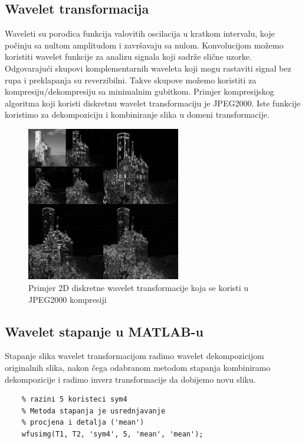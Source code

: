 \documentclass[lmodern, utf8, seminar]{fer}
\begin{document}
\subsection{Wavelet transformacija}
Waveleti su porodica funkcija valovitih oscilacija u kratkom intervalu, koje počinju sa nultom amplitudom i završavaju sa nulom. Konvolucijom možemo koristiti wavelet funkcije za analizu signala koji sadrže slične uzorke. Odgovarajući skupovi komplementarnih waveleta koji mogu rastaviti signal bez rupa i preklapanja su reverzibilni. Takve skupove možemo koristiti za kompresiju/dekompresiju sa minimalnim gubitkom. Primjer kompresijskog algoritma koji koristi diskretnu wavelet transformaciju je JPEG2000. Iste funkcije koristimo za dekompoziciju i kombiniranje slika u domeni transformacije. 

\begin{figure}[H]
	\centering
	\includegraphics[width=0.6\textwidth]{jpeg2000}
	\caption{Primjer 2D diskretne wavelet transformacije koja se koristi u JPEG2000 kompresiji}
	\label{fig:jpeg2000}
\end{figure}

\subsection{Wavelet stapanje u MATLAB-u}

Stapanje slika wavelet transformacijom radimo wavelet dekompozicijom originalnih slika, nakon čega odabranom metodom stapanja kombiniramo dekompozicije i radimo inverz transformacije da dobijemo novu sliku.

\begin{lstlisting}[frame=single]
	% Stapanje dvije slike T1 i T2 na 
	% razini 5 koristeci sym4
	% Metoda stapanja je usrednjavanje
	% procjena i detalja ('mean')
	wfusimg(T1, T2, 'sym4', 5, 'mean', 'mean');
\end{lstlisting}
\end{document}
